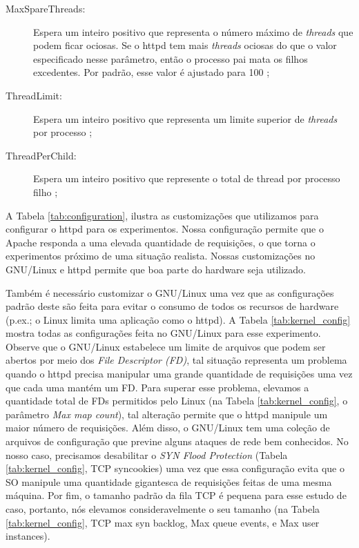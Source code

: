 \begin{description}
  \item [MaxSpareThreads:]
Espera um inteiro positivo que representa o número máximo de \emph{threads} que podem
ficar ociosas. Se o httpd tem mais \emph{threads} ociosas do que o valor especificado
nesse parâmetro, então o processo pai mata os filhos excedentes. Por padrão,
esse valor é ajustado para 100 \citep{mpm_maxsparethreads};

  \item [ThreadLimit:]
Espera um inteiro positivo que representa um limite superior de \emph{threads} por
processo \citep{mpm_threadlimits};

  \item [ThreadPerChild:]
Espera um inteiro positivo que represente o total de thread por processo filho
\citep{mpm_threadperchild};

\end{description}



A Tabela \ref{tab:configuration}, ilustra as customizações que utilizamos para
configurar o httpd para os experimentos. Nossa configuração permite que o
Apache responda a uma elevada quantidade de requisições, o que torna o
experimentos próximo de uma situação realista. Nossas customizações no
GNU/Linux e httpd permite que boa parte do hardware seja utilizado.



Também é necessário customizar o GNU/Linux uma vez que as configurações padrão
deste são feita para evitar o consumo de todos os recursos de hardware (p.ex.; o
Linux limita uma aplicação como o httpd). A Tabela \ref{tab:kernel_config}
mostra todas as configurações feita no GNU/Linux para esse experimento.
Observe que o GNU/Linux estabelece um limite de arquivos que podem ser abertos
por meio dos \emph{File Descriptor (FD)}, tal situação representa um problema
quando o httpd precisa manipular uma grande quantidade de requisições uma vez que cada uma
mantém um FD. Para superar esse problema, elevamos a quantidade
total de FDs permitidos pelo Linux (na Tabela \ref{tab:kernel_config}, o
parâmetro \emph{Max map count}), tal alteração permite que o httpd manipule um
maior número de requisições. Além disso, o GNU/Linux tem uma coleção de
arquivos de configuração que previne alguns ataques de rede bem conhecidos. No
nosso caso, precisamos desabilitar o \emph{SYN Flood Protection} (Tabela
\ref{tab:kernel_config}, TCP syncookies) uma vez que essa configuração evita
que o SO manipule uma quantidade gigantesca de requisições feitas de uma mesma
máquina. Por fim, o tamanho padrão da fila TCP é pequena para esse estudo de
caso, portanto, nós elevamos consideravelmente o seu tamanho (na Tabela
\ref{tab:kernel_config}, TCP max syn backlog, Max queue events, e Max user
instances).

